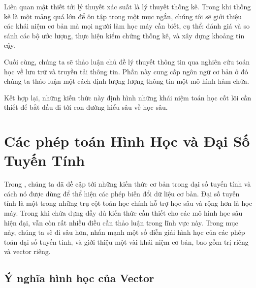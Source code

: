 \documentclass[letterpaper,11pt,english]{sphinxmanual}
\begin{document}
Liên quan mật thiết tới lý thuyết xác suất là lý thuyết thống kê. Trong
khi thống kê là một mảng quá lớn để ôn tập trong một mục ngắn, chúng tôi
sẽ giới thiệu các khái niệm cơ bản mà mọi người làm học máy cần biết, cụ
thể: đánh giá và so sánh các bộ ước lượng, thực hiện kiểm chứng thống
kê, và xây dựng khoảng tin cậy.



Cuối cùng, chúng ta sẽ thảo luận chủ đề lý thuyết thông tin qua nghiên
cứu toán học về lưu trữ và truyền tải thông tin. Phần này cung cấp ngôn
ngữ cơ bản ở đó chúng ta thảo luận một cách định lượng lượng thông tin
một mô hình hàm chứa.



Kết hợp lại, những kiến thức này định hình những khái niệm toán học cốt
lõi cần thiết để bắt đầu đi tới con đường hiểu sâu về học sâu.






\section{Các phép toán Hình Học và Đại Số Tuyến Tính}
\label{\detokenize{chapter_appendix_math/geometry-linear-algebric-ops_vn:cac-phep-toan-hinh-hoc-va-dai-so-tuyen-tinh}}\label{\detokenize{chapter_appendix_math/geometry-linear-algebric-ops_vn:sec-geometry-linear-algebric-ops}}\label{\detokenize{chapter_appendix_math/geometry-linear-algebric-ops_vn::doc}}


Trong , chúng ta đã đề cập tới những kiến
thức cơ bản trong đại số tuyến tính và cách nó được dùng để thể hiện các
phép biến đổi dữ liệu cơ bản. Đại số tuyến tính là một trong những trụ
cột toán học chính hỗ trợ học sâu và rộng hơn là học máy. Trong khi
 chứa đựng đầy đủ kiến thức cần thiết cho
các mô hình học sâu hiện đại, vẫn còn rất nhiều điều cần thảo luận trong
lĩnh vực này. Trong mục này, chúng ta sẽ đi sâu hơn, nhấn mạnh một số
diễn giải hình học của các phép toán đại số tuyến tính, và giới thiệu
một vài khái niệm cơ bản, bao gồm trị riêng và vector riêng.




\subsection{Ý nghĩa hình học của Vector}
\label{\detokenize{chapter_appendix_math/geometry-linear-algebric-ops_vn:y-nghia-hinh-hoc-cua-vector}}
\end{document}
